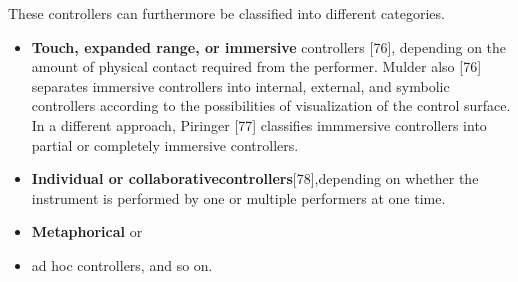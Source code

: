These controllers can furthermore be classified into different categories.
\begin{itemize}[noitemsep]
\item \textbf{Touch, expanded range, or immersive} controllers [76], depending on the amount of physical contact required from the performer. Mulder also [76] separates immersive controllers into internal, external, and symbolic controllers according to the possibilities of visualization of the control surface. In a different approach, Piringer [77] classifies immmersive controllers into partial or completely immersive controllers.
\item \textbf{Individual or collaborativecontrollers}[78],depending on whether the instrument is performed by one or multiple performers at one time.
\item \textbf{Metaphorical} or \item{ad hoc} controllers, and so on.
\end{itemize}


